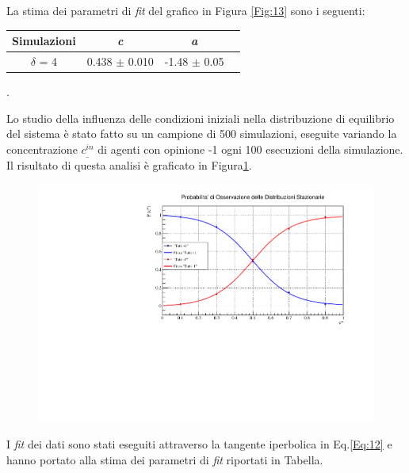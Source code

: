 \documentclass{article}
\begin{document}
La stima dei parametri di \textit{fit} del grafico in Figura \ref{Fig:13} sono i seguenti:

\begin{center}
\begin{tabular}{ |c|c|c|c| } 
\hline
 Simulazioni & \textit{c} & \textit{a} \\
\hline
\multirow{1}{3em}{$\delta$ = 4 }
& 0.438 $\pm$ 0.010 & -1.48 $\pm$ 0.05 \\ 
\hline
\end{tabular}
\end{center}.

Lo studio della influenza delle condizioni iniziali nella distribuzione di equilibrio del sistema è stato fatto su un campione di 500 simulazioni, eseguite variando la concentrazione $c^{in}_{ \_ }$ di agenti con opinione -1 ogni 100 esecuzioni della simulazione. Il risultato di questa analisi è graficato in Figura\ref{Fig:12}.

\begin{figure}
\centering
\includegraphics{fit_grav.pdf}
\label{Fig:12}
\end{figure}

I \textit{fit} dei dati sono stati eseguiti attraverso la tangente iperbolica in Eq.\ref{Eq:12} e hanno portato alla stima dei parametri di \textit{fit} riportati in Tabella.
\end{document}
